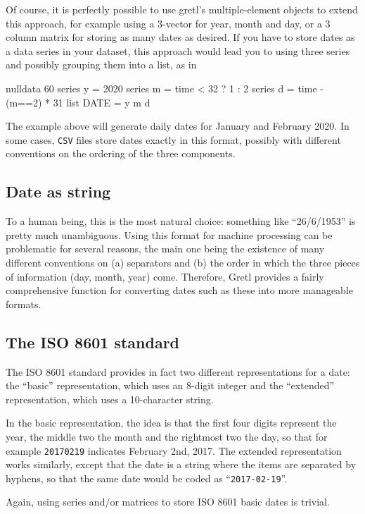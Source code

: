 Of course, it is perfectly possible to use gretl's multiple-element
objects to extend this approach, for example using a 3-vector for
year, month and day, or a 3 column matrix for storing as many dates as
desired. If you have to store dates as a data series in your dataset,
this approach would lead you to using three series and possibly
grouping them into a list, as in
\begin{code}
  nulldata 60
  series y = 2020
  series m = time < 32 ? 1 : 2
  series d = time - (m==2) * 31
  list DATE = y m d
\end{code}
The example above will generate daily dates for January and February
2020. In some cases, \texttt{CSV} files store dates exactly in this
format, possibly with different conventions on the ordering of the
three components.

\subsection{Date as string}
\label{sec:cal-generic-string}

To a human being, this is the most natural choice: something like
``26/6/1953'' is pretty much unambiguous. Using this format for
machine processing can be problematic for several reasons, the main
one being the existence of many different conventions on (a)
separators and (b) the order in which the three pieces of information
(day, month, year) come. Therefore, Gretl provides a fairly
comprehensive function for converting dates such as these into more
manageable formats.

\subsection{The ISO 8601 standard}
\label{sec:cal-ISO8601}

The ISO 8601 standard provides in fact two different representations
for a date: the ``basic'' representation, which uses an 8-digit
integer and the ``extended'' representation, which uses a 10-character
string.

In the basic representation, the idea is that the first four digits
represent the year, the middle two the month and the rightmost two the
day, so that for example \texttt{20170219} indicates February 2nd,
2017. The extended representation works similarly, except that the
date is a string where the items are separated by hyphens, so that the
same date would be coded as ``\texttt{2017-02-19}''.

Again, using series and/or matrices to store ISO 8601 basic dates is
trivial.

